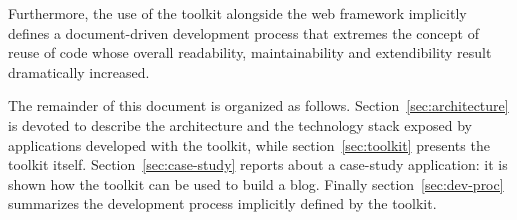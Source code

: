 Furthermore, the use of the toolkit alongside the web framework implicitly defines a document-driven development process that extremes the concept of reuse of code whose overall readability, maintainability and extendibility result dramatically increased.

The remainder of this document is organized as follows. Section~\ref{sec:architecture} is devoted to describe the architecture and the technology stack exposed by applications developed with the toolkit, while section~\ref{sec:toolkit} presents the toolkit itself. Section~\ref{sec:case-study} reports about a case-study application: it is shown how the toolkit can be used to build a blog. Finally section~\ref{sec:dev-proc} summarizes the development process implicitly defined by the  toolkit.

